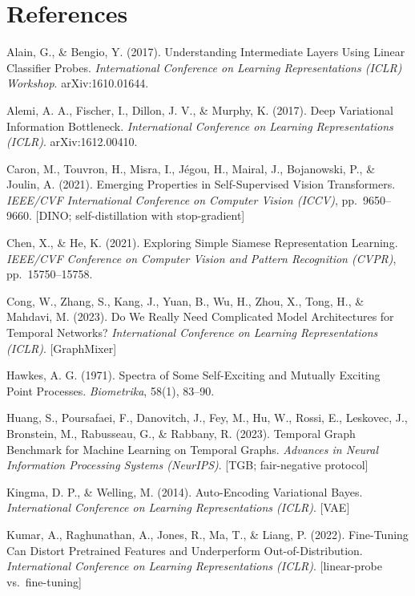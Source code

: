 \documentclass[conference]{IEEEtran}
\begin{document}
\section*{References}
{\footnotesize
\begin{list}{}{\setlength{\leftmargin}{1em}\setlength{\itemindent}{-1em}\setlength{\itemsep}{2pt}\setlength{\parsep}{0pt}}
\item Alain, G., \& Bengio, Y. (2017). Understanding Intermediate Layers Using Linear Classifier Probes. \emph{International Conference on Learning Representations (ICLR) Workshop}. arXiv:1610.01644.
\item Alemi, A. A., Fischer, I., Dillon, J. V., \& Murphy, K. (2017). Deep Variational Information Bottleneck. \emph{International Conference on Learning Representations (ICLR)}. arXiv:1612.00410.
\item Caron, M., Touvron, H., Misra, I., J\'egou, H., Mairal, J., Bojanowski, P., \& Joulin, A. (2021). Emerging Properties in Self-Supervised Vision Transformers. \emph{IEEE/CVF International Conference on Computer Vision (ICCV)}, pp.\ 9650--9660. [DINO; self-distillation with stop-gradient]
\item Chen, X., \& He, K. (2021). Exploring Simple Siamese Representation Learning. \emph{IEEE/CVF Conference on Computer Vision and Pattern Recognition (CVPR)}, pp.\ 15750--15758.
\item Cong, W., Zhang, S., Kang, J., Yuan, B., Wu, H., Zhou, X., Tong, H., \& Mahdavi, M. (2023). Do We Really Need Complicated Model Architectures for Temporal Networks? \emph{International Conference on Learning Representations (ICLR)}. [GraphMixer]
\item Hawkes, A. G. (1971). Spectra of Some Self-Exciting and Mutually Exciting Point Processes. \emph{Biometrika}, 58(1), 83--90.
\item Huang, S., Poursafaei, F., Danovitch, J., Fey, M., Hu, W., Rossi, E., Leskovec, J., Bronstein, M., Rabusseau, G., \& Rabbany, R. (2023). Temporal Graph Benchmark for Machine Learning on Temporal Graphs. \emph{Advances in Neural Information Processing Systems (NeurIPS)}. [TGB; fair-negative protocol]
\item Kingma, D. P., \& Welling, M. (2014). Auto-Encoding Variational Bayes. \emph{International Conference on Learning Representations (ICLR)}. [VAE]
\item Kumar, A., Raghunathan, A., Jones, R., Ma, T., \& Liang, P. (2022). Fine-Tuning Can Distort Pretrained Features and Underperform Out-of-Distribution. \emph{International Conference on Learning Representations (ICLR)}. [linear-probe vs.\ fine-tuning]

\end{list}}
\end{document}
